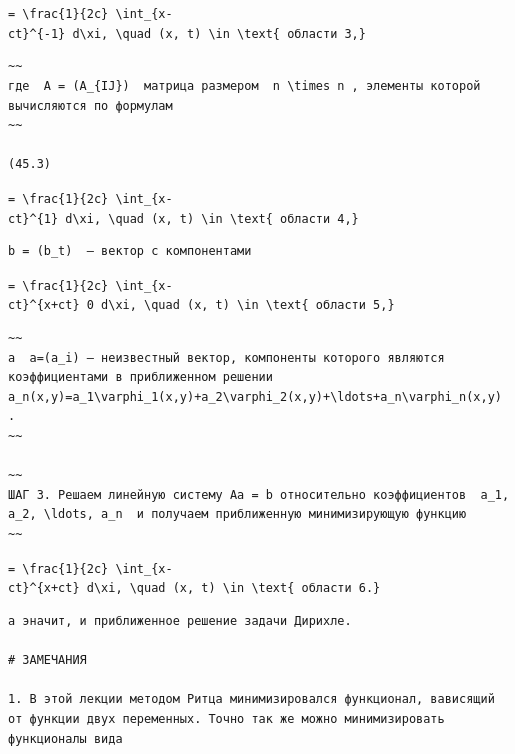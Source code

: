 \documentclass[
  ukrainian,
]{article}
\begin{document}
\texttt{=\ \textbackslash{}frac\{1\}\{2c\}\ \textbackslash{}int\_\{x-ct\}\^{}\{-1\}\ d\textbackslash{}xi,\ \textbackslash{}quad\ (x,\ t)\ \textbackslash{}in\ \textbackslash{}text\{\ области\ 3,\}}

\begin{verbatim}
~~
где  A = (A_{IJ})  матрица размером  n \times n , элементы которой вычисляются по формулам
~~

(45.3)
\end{verbatim}

\texttt{=\ \textbackslash{}frac\{1\}\{2c\}\ \textbackslash{}int\_\{x-ct\}\^{}\{1\}\ d\textbackslash{}xi,\ \textbackslash{}quad\ (x,\ t)\ \textbackslash{}in\ \textbackslash{}text\{\ области\ 4,\}}

\begin{verbatim}
b = (b_t)  — вектор с компонентами
\end{verbatim}

\texttt{=\ \textbackslash{}frac\{1\}\{2c\}\ \textbackslash{}int\_\{x-ct\}\^{}\{x+ct\}\ 0\ d\textbackslash{}xi,\ \textbackslash{}quad\ (x,\ t)\ \textbackslash{}in\ \textbackslash{}text\{\ области\ 5,\}}

\begin{verbatim}
~~
а  a=(a_i) — неизвестный вектор, компоненты которого являются коэффициентами в приближенном решении  a_n(x,y)=a_1\varphi_1(x,y)+a_2\varphi_2(x,y)+\ldots+a_n\varphi_n(x,y) .
~~

~~
ШАГ 3. Решаем линейную систему Aa = b относительно коэффициентов  a_1, a_2, \ldots, a_n  и получаем приближенную минимизирующую функцию
~~
\end{verbatim}

\texttt{=\ \textbackslash{}frac\{1\}\{2c\}\ \textbackslash{}int\_\{x-ct\}\^{}\{x+ct\}\ d\textbackslash{}xi,\ \textbackslash{}quad\ (x,\ t)\ \textbackslash{}in\ \textbackslash{}text\{\ области\ 6.\}}

\begin{verbatim}
а эначит, и приближенное решение задачи Дирихле.

# ЗАМЕЧАНИЯ

1. В этой лекции методом Ритца минимизировался функционал, вависящий от функции двух переменных. Точно так же можно минимизировать функционалы вида
\end{verbatim}
\end{document}
